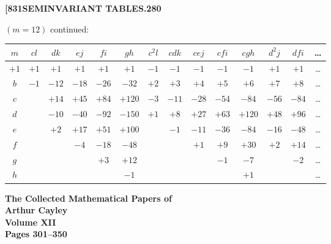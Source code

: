 \documentclass[11pt,a4paper]{book}
\begin{document}
\newpage
\setcounter{page}{280}

\noindent\textbf{[831}\hfill\textbf{SEMINVARIANT TABLES.}\hfill\textbf{280}

\bigskip

\noindent $(m = 12)$ continued:
\begin{center}
\small
\begin{tabular}{|c|c|c|c|c|c|c|c|c|c|c|c|c|c|}
\hline
$m$ & $cl$ & $dk$ & $ej$ & $fi$ & $gh$ & $c^2l$ & $cdk$ & $cej$ & $cfi$ & $cgh$ & $d^2j$ & $dfi$ & \dots \\
\hline
$+1$ & $+1$ & $+1$ & $+1$ & $+1$ & $+1$ & $-1$ & $-1$ & $-1$ & $-1$ & $-1$ & $+1$ & $+1$ & \dots \\
$b$ & $-1$ & $-12$ & $-18$ & $-26$ & $-32$ & $+2$ & $+3$ & $+4$ & $+5$ & $+6$ & $+7$ & $+8$ & \dots \\
$c$ & & $+14$ & $+45$ & $+84$ & $+120$ & $-3$ & $-11$ & $-28$ & $-54$ & $-84$ & $-56$ & $-84$ & \dots \\
$d$ & & $-10$ & $-40$ & $-92$ & $-150$ & $+1$ & $+8$ & $+27$ & $+63$ & $+120$ & $+48$ & $+96$ & \dots \\
$e$ & & $+2$ & $+17$ & $+51$ & $+100$ & & $-1$ & $-11$ & $-36$ & $-84$ & $-16$ & $-48$ & \dots \\
$f$ & & & $-4$ & $-18$ & $-48$ & & & $+1$ & $+9$ & $+30$ & $+2$ & $+14$ & \dots \\
$g$ & & & & $+3$ & $+12$ & & & & $-1$ & $-7$ & & $-2$ & \dots \\
$h$ & & & & & $-1$ & & & & & $+1$ & & & \dots \\
\hline
\end{tabular}
\end{center}

\medskip

\clearpage


\begin{center}
\Large\textbf{The Collected Mathematical Papers of}\\[6pt]
\LARGE\textbf{Arthur Cayley}\\[12pt]
\Large\textbf{Volume XII}\\[24pt]
\large\textbf{Pages 301--350}
\end{center}
\end{document}
